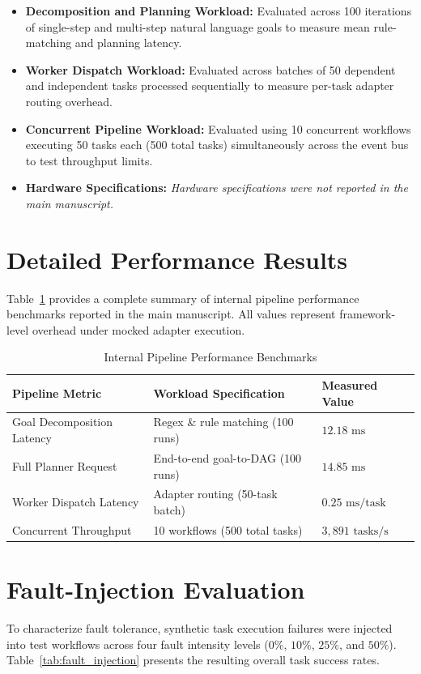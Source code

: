 \documentclass[conference]{IEEEtran}
\begin{document}
\begin{itemize}
    \item \textbf{Decomposition and Planning Workload:} Evaluated across 100 iterations of single-step and multi-step natural language goals to measure mean rule-matching and planning latency.
    \item \textbf{Worker Dispatch Workload:} Evaluated across batches of 50 dependent and independent tasks processed sequentially to measure per-task adapter routing overhead.
    \item \textbf{Concurrent Pipeline Workload:} Evaluated using 10 concurrent workflows executing 50 tasks each (500 total tasks) simultaneously across the event bus to test throughput limits.
    \item \textbf{Hardware Specifications:} \textit{Hardware specifications were not reported in the main manuscript.}
\end{itemize}

\section{Detailed Performance Results}
\label{sec:results}
Table~\ref{tab:performance_results} provides a complete summary of internal pipeline performance benchmarks reported in the main manuscript. All values represent framework-level overhead under mocked adapter execution.

\begin{table}[htbp]
\caption{Internal Pipeline Performance Benchmarks}
\label{tab:performance_results}
\centering
\begin{tabular}{p{2.6cm} p{3.6cm} p{1.6cm}}
\toprule
\textbf{Pipeline Metric} & \textbf{Workload Specification} & \textbf{Measured Value} \\
\midrule
Goal Decomposition Latency & Regex \& rule matching (100 runs) & $12.18\text{ ms}$ \\
Full Planner Request & End-to-end goal-to-DAG (100 runs) & $14.85\text{ ms}$ \\
Worker Dispatch Latency & Adapter routing (50-task batch) & $0.25\text{ ms/task}$ \\
Concurrent Throughput & 10 workflows (500 total tasks) & $3,891\text{ tasks/s}$ \\
\bottomrule
\end{tabular}
\end{table}

\section{Fault-Injection Evaluation}
\label{sec:fault_injection}
To characterize fault tolerance, synthetic task execution failures were injected into test workflows across four fault intensity levels ($0\%$, $10\%$, $25\%$, and $50\%$). Table~\ref{tab:fault_injection} presents the resulting overall task success rates.
\end{document}
